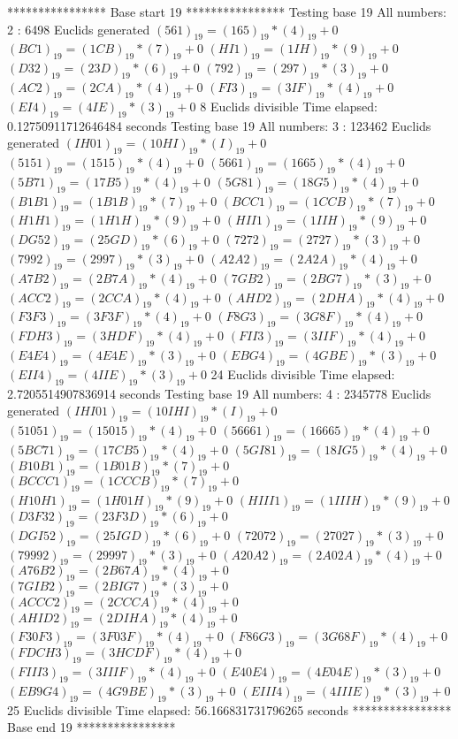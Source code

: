 **************** Base start 19 ****************
Testing base 19 All numbers: 2 :
	 6498 Euclids generated
	$(561)_{19}=(165)_{19}*(4)_{19}+0$
	$(BC1)_{19}=(1CB)_{19}*(7)_{19}+0$
	$(HI1)_{19}=(1IH)_{19}*(9)_{19}+0$
	$(D32)_{19}=(23D)_{19}*(6)_{19}+0$
	$(792)_{19}=(297)_{19}*(3)_{19}+0$
	$(AC2)_{19}=(2CA)_{19}*(4)_{19}+0$
	$(FI3)_{19}=(3IF)_{19}*(4)_{19}+0$
	$(EI4)_{19}=(4IE)_{19}*(3)_{19}+0$
	 8 Euclids divisible
Time elapsed: 0.12750911712646484 seconds
Testing base 19 All numbers: 3 :
	 123462 Euclids generated
	$(IH01)_{19}=(10HI)_{19}*(I)_{19}+0$
	$(5151)_{19}=(1515)_{19}*(4)_{19}+0$
	$(5661)_{19}=(1665)_{19}*(4)_{19}+0$
	$(5B71)_{19}=(17B5)_{19}*(4)_{19}+0$
	$(5G81)_{19}=(18G5)_{19}*(4)_{19}+0$
	$(B1B1)_{19}=(1B1B)_{19}*(7)_{19}+0$
	$(BCC1)_{19}=(1CCB)_{19}*(7)_{19}+0$
	$(H1H1)_{19}=(1H1H)_{19}*(9)_{19}+0$
	$(HII1)_{19}=(1IIH)_{19}*(9)_{19}+0$
	$(DG52)_{19}=(25GD)_{19}*(6)_{19}+0$
	$(7272)_{19}=(2727)_{19}*(3)_{19}+0$
	$(7992)_{19}=(2997)_{19}*(3)_{19}+0$
	$(A2A2)_{19}=(2A2A)_{19}*(4)_{19}+0$
	$(A7B2)_{19}=(2B7A)_{19}*(4)_{19}+0$
	$(7GB2)_{19}=(2BG7)_{19}*(3)_{19}+0$
	$(ACC2)_{19}=(2CCA)_{19}*(4)_{19}+0$
	$(AHD2)_{19}=(2DHA)_{19}*(4)_{19}+0$
	$(F3F3)_{19}=(3F3F)_{19}*(4)_{19}+0$
	$(F8G3)_{19}=(3G8F)_{19}*(4)_{19}+0$
	$(FDH3)_{19}=(3HDF)_{19}*(4)_{19}+0$
	$(FII3)_{19}=(3IIF)_{19}*(4)_{19}+0$
	$(E4E4)_{19}=(4E4E)_{19}*(3)_{19}+0$
	$(EBG4)_{19}=(4GBE)_{19}*(3)_{19}+0$
	$(EII4)_{19}=(4IIE)_{19}*(3)_{19}+0$
	 24 Euclids divisible
Time elapsed: 2.7205514907836914 seconds
Testing base 19 All numbers: 4 :
	 2345778 Euclids generated
	$(IHI01)_{19}=(10IHI)_{19}*(I)_{19}+0$
	$(51051)_{19}=(15015)_{19}*(4)_{19}+0$
	$(56661)_{19}=(16665)_{19}*(4)_{19}+0$
	$(5BC71)_{19}=(17CB5)_{19}*(4)_{19}+0$
	$(5GI81)_{19}=(18IG5)_{19}*(4)_{19}+0$
	$(B10B1)_{19}=(1B01B)_{19}*(7)_{19}+0$
	$(BCCC1)_{19}=(1CCCB)_{19}*(7)_{19}+0$
	$(H10H1)_{19}=(1H01H)_{19}*(9)_{19}+0$
	$(HIII1)_{19}=(1IIIH)_{19}*(9)_{19}+0$
	$(D3F32)_{19}=(23F3D)_{19}*(6)_{19}+0$
	$(DGI52)_{19}=(25IGD)_{19}*(6)_{19}+0$
	$(72072)_{19}=(27027)_{19}*(3)_{19}+0$
	$(79992)_{19}=(29997)_{19}*(3)_{19}+0$
	$(A20A2)_{19}=(2A02A)_{19}*(4)_{19}+0$
	$(A76B2)_{19}=(2B67A)_{19}*(4)_{19}+0$
	$(7GIB2)_{19}=(2BIG7)_{19}*(3)_{19}+0$
	$(ACCC2)_{19}=(2CCCA)_{19}*(4)_{19}+0$
	$(AHID2)_{19}=(2DIHA)_{19}*(4)_{19}+0$
	$(F30F3)_{19}=(3F03F)_{19}*(4)_{19}+0$
	$(F86G3)_{19}=(3G68F)_{19}*(4)_{19}+0$
	$(FDCH3)_{19}=(3HCDF)_{19}*(4)_{19}+0$
	$(FIII3)_{19}=(3IIIF)_{19}*(4)_{19}+0$
	$(E40E4)_{19}=(4E04E)_{19}*(3)_{19}+0$
	$(EB9G4)_{19}=(4G9BE)_{19}*(3)_{19}+0$
	$(EIII4)_{19}=(4IIIE)_{19}*(3)_{19}+0$
	 25 Euclids divisible
Time elapsed: 56.166831731796265 seconds
**************** Base end 19 ****************

